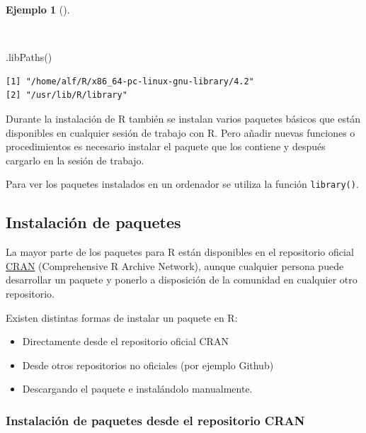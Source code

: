 \documentclass[
  spanish,
  a4paper,
]{scrreport}
\newenvironment{Shaded}{\begin{snugshade}}{\end{snugshade}}
\newcommand{\FunctionTok}[1]{\textcolor[rgb]{0.28,0.35,0.67}{#1}}
\newcommand{\NormalTok}[1]{\textcolor[rgb]{0.00,0.23,0.31}{#1}}
\providecommand{\tightlist}{%
  \setlength{\itemsep}{0pt}\setlength{\parskip}{0pt}}
\theoremstyle{definition}
\theoremstyle{definition}
\newtheorem{example}{Ejemplo}[chapter]
\theoremstyle{remark}
\begin{document}
\begin{example}[]\protect\hypertarget{exm-ubiacion-biblioteca-paquetes}{}\label{exm-ubiacion-biblioteca-paquetes}

~

\begin{Shaded}
\begin{Highlighting}[]
\FunctionTok{.libPaths}\NormalTok{()}
\end{Highlighting}
\end{Shaded}

\begin{verbatim}
[1] "/home/alf/R/x86_64-pc-linux-gnu-library/4.2"
[2] "/usr/lib/R/library"                         
\end{verbatim}

\end{example}

Durante la instalación de R también se instalan varios paquetes básicos
que están disponibles en cualquier sesión de trabajo con R. Pero añadir
nuevas funciones o procedimientos es necesario instalar el paquete que
los contiene y después cargarlo en la sesión de trabajo.

Para ver los paquetes instalados en un ordenador se utiliza la función
\texttt{library()}.

\subsection{Instalación de paquetes}\label{instalaciuxf3n-de-paquetes-1}

La mayor parte de los paquetes para R están disponibles en el
repositorio oficial
\href{Comprehensive\%20R\%20Archive\%20Network}{CRAN} (Comprehensive R
Archive Network), aunque cualquier persona puede desarrollar un paquete
y ponerlo a disposición de la comunidad en cualquier otro repositorio.

Existen distintas formas de instalar un paquete en R:

\begin{itemize}
\tightlist
\item
  Directamente desde el repositorio oficial CRAN
\item
  Desde otros repositorios no oficiales (por ejemplo Github)
\item
  Descargando el paquete e instalándolo manualmente.
\end{itemize}

\subsubsection{Instalación de paquetes desde el repositorio
CRAN}\label{instalaciuxf3n-de-paquetes-desde-el-repositorio-cran}
\end{document}
